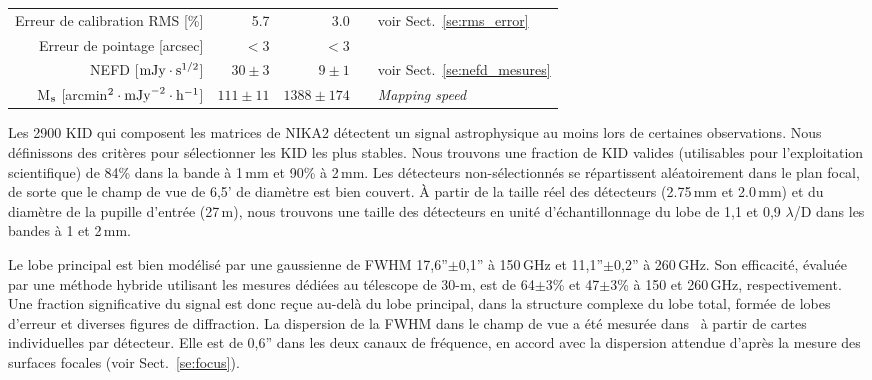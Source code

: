 \begin{table}[!thbp]
\begin{tabular}{rrrcl}
  Erreur de calibration RMS [\%]          &   5.7       &     3.0       & & \footnotesize{voir Sect.~\ref{se:rms_error}} \\
  Erreur de pointage    [arcsec]          & $<3$ &  $<3$  & & \footnotesize{\citet{Greve1996}} \\
  \hline
  \noalign{\smallskip}
  NEFD \hspace{3mm} [$\rm{mJy} \cdot \rm{s}^{1/2}$]  & $30 \pm 3$  & $9 \pm 1$ &  & \footnotesize{voir Sect.~\ref{se:nefd_mesures}}\\
  M$_{\rm{s}}$\hspace{3mm} [arcmin$^2 \cdot
    \rm{mJy}^{-2} \cdot \rm{h}^{-1}$] & $111 \pm 11$  &  $1388 \pm 174$ &  & \footnotesize{\emph{Mapping speed}}\\
  \hline
  \end{tabular}
\end{table}

Les 2900 KID qui composent les matrices de NIKA2 détectent un signal
astrophysique au moins lors de certaines observations. Nous
définissons des critères pour sélectionner les KID les plus
stables. Nous trouvons une fraction de KID valides (utilisables pour
l'exploitation scientifique) de 84\% dans la bande à 1\,mm et 90\% à
2\,mm. Les détecteurs non-sélectionnés se répartissent aléatoirement
dans le plan focal, de sorte que le champ de vue de 6,5' de diamètre
est bien couvert. \`A partir de la taille réel des détecteurs
(2.75\,mm et 2.0\,mm) et du diamètre de la pupille d'entrée (27\,m),
nous trouvons une taille des détecteurs en unité d'échantillonnage du
lobe de 1,1 et 0,9 $\lambda$/D dans les bandes à 1 et 2\,mm.   

Le lobe principal est bien modélisé par une gaussienne de FWHM
17,6''$\pm$0,1'' à 150\,GHz et 11,1''$\pm$0,2'' à 260\,GHz. Son
efficacité, évaluée par une méthode hybride utilisant les mesures
dédiées au télescope de 30-m, est de 64$\pm$3\% et 47$\pm$3\% à 150 et
260\,GHz, respectivement. Une fraction significative du signal est
donc reçue au-delà du lobe principal, dans la structure complexe du lobe
total, formée de lobes d'erreur et diverses figures de diffraction. La
dispersion de la FWHM dans le champ de vue a été mesurée
dans~\citet{Adam2018} à partir de cartes individuelles par
détecteur. Elle est de 0,6'' dans les deux
canaux de fréquence, en accord avec la dispersion attendue d'après la
mesure des surfaces focales (voir Sect.~\ref{se:focus}).   

